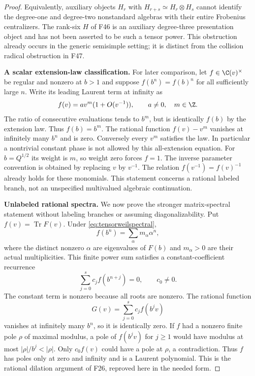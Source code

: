 \documentclass[11pt,a4paper]{article}
\newcommand{\fid}[1]{\textsf{#1}}\newcommand{\gate}[1]{\textsf{#1}}
\theoremstyle{named}\newtheorem{finding}{Finding}[section]
\theoremstyle{definition}\newtheorem{definition}[finding]{Definition}
\theoremstyle{remark}\newtheorem{remark}[finding]{Remark}
\begin{document}
\begin{proof}
Equivalently, auxiliary objects $H_r$ with
$H_{r+s}\simeq H_r\otimes H_s$ cannot identify the
degree-one and degree-two nonstandard algebras with
their entire Frobenius centralizers.
The rank-six $H$ of \fid{F46} is an auxiliary degree-three
presentation object and has not been asserted to be
such a tensor power.
This obstruction already occurs in the generic
semisimple setting; it is distinct from the collision
radical obstruction in \fid{F47}.

\par\smallskip\noindent\textbf{A scalar extension-law classification.}\quad
For later comparison, let $f\in\C(v)^\times$ be regular
and nonzero at $b>1$ and suppose
$f(b^n)=f(b)^n$ for all sufficiently large $n$.
Write its leading Laurent term at infinity as
\[
 f(v)=a v^m(1+O(v^{-1})),\qquad a\ne0,\quad m\in\Z.
\]
The ratio of consecutive evaluations tends to $b^m$,
but is identically $f(b)$ by the extension law.
Thus $f(b)=b^m$. The rational function $f(v)-v^m$
vanishes at infinitely many $b^n$ and is zero.
Conversely every $v^m$ satisfies the law.
In particular a nontrivial constant phase is not allowed
by this all-extension equation.
For $b=Q^{1/2}$ its weight is $m$, so weight zero forces
$f=1$. The inverse parameter convention is obtained by
replacing $v$ by $v^{-1}$.
The relation $f(v^{-1})=f(v)^{-1}$ already holds for
these monomials. This statement concerns a rational
labeled branch, not an unspecified multivalued
algebraic continuation.

\par\smallskip\noindent\textbf{Unlabeled rational spectra.}\quad
We now prove the stronger matrix-spectral statement
without labeling branches or assuming diagonalizability.
Put $f(v)=\operatorname{Tr}F(v)$.
Under \eqref{eq:tensorweilspectral},
\[
 f(b^n)=\sum_\alpha m_\alpha\alpha^n,
\]
where the distinct nonzero $\alpha$ are eigenvalues of
$F(b)$ and $m_\alpha>0$ are their actual multiplicities.
This finite power sum satisfies a constant-coefficient
recurrence
\[
 \sum_{j=0}^s c_j f(b^{n+j})=0,\qquad c_0\ne0.
\]
The constant term is nonzero because all roots are nonzero.
The rational function
\[
 G(v)=\sum_{j=0}^s c_j f(b^jv)
\]
vanishes at infinitely many $b^n$, so it is identically
zero. If $f$ had a nonzero finite pole $\rho$ of maximal
modulus, a pole of $f(b^jv)$ for $j\ge1$ would have modulus
at most $|\rho|/b^j<|\rho|$.
Only $c_0f(v)$ could have a pole at $\rho$, a contradiction.
Thus $f$ has poles only at zero and infinity and is a
Laurent polynomial. This is the rational dilation
argument of \fid{F26}, reproved here in the needed form.


\end{proof}
\end{document}
